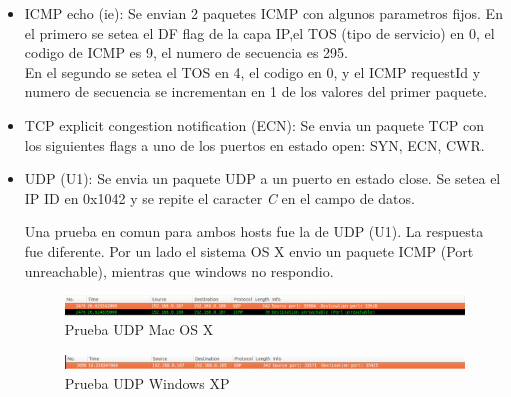\documentclass[a4paper]{article}
\begin{document}
\begin{itemize}

\item ICMP echo (ie): Se envian 2 paquetes ICMP con algunos parametros fijos. En el primero se setea el DF flag de la capa IP,el TOS (tipo de servicio) en 0, el codigo de ICMP es 9, el numero de secuencia es 295.\\
En el segundo se setea el TOS en 4, el codigo en 0, y el ICMP requestId y numero de secuencia se incrementan en 1 de los valores del primer paquete.

\item TCP explicit congestion notification (ECN): Se envia un paquete TCP con los siguientes flags a uno de los puertos en estado open: SYN, ECN, CWR.

\item UDP (U1): Se envia un paquete UDP a un puerto en estado close. Se setea el IP ID en 0x1042 y se repite el caracter  \textit{C} en el campo de datos. 


Una prueba en comun para ambos hosts fue la de UDP (U1). La respuesta fue diferente. Por un lado el sistema OS X envio un paquete ICMP (Port unreachable), mientras que windows no respondio. 

\begin{figure}[H]
  \centering
  \includegraphics[scale=0.40]{graficos/macUdp.png}
  \caption{Prueba UDP Mac OS X}
\end{figure}  

\begin{figure}[H]
  \centering
  \includegraphics[scale=0.40]{graficos/windowsUdp.png}
  \caption{Prueba UDP Windows XP}
\end{figure} 
 
 

\end{itemize}
\end{document}
